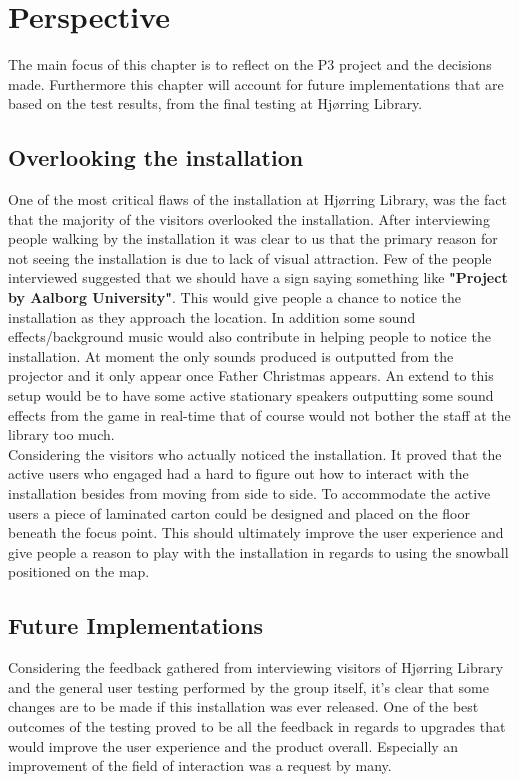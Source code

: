 \chapter{Perspective}
The main focus of this chapter is to reflect on the P3 project and the decisions made. Furthermore this chapter will account for future implementations that are based on the test results, from the final testing at Hj{\o}rring Library.
\section{Overlooking the installation}
One of the most critical flaws of the installation at Hj{\o}rring Library, was the fact that the majority of the visitors overlooked the installation. After interviewing people walking by the installation it was clear to us that the primary reason for not seeing the installation is due to lack of visual attraction. Few of the people interviewed suggested that we should have a sign saying something like \textbf{"Project by Aalborg University"}. This would give people a chance to notice the installation as they approach the location. In addition some sound effects/background music would also contribute in helping people to notice the installation. At moment the only sounds produced is outputted from the projector and it only appear once Father Christmas appears. An extend to this setup would be to have some active stationary speakers outputting some sound effects from the game in real-time that of course would not bother the staff at the library too much.\\
Considering the visitors who actually noticed the installation. It proved that the active users who engaged had a hard to figure out how to interact with the installation besides from moving from side to side. To accommodate the active users a piece of laminated carton could be designed and placed on the floor beneath the focus point. This should ultimately improve the user experience and give people a reason to play with the installation in regards to using the snowball positioned on the map.\\

\section{Future Implementations}
Considering the feedback gathered from interviewing visitors of Hj{\o}rring Library and the general user testing performed by the group itself, it's clear that some changes are to be made if this installation was ever released. One of the best outcomes of the testing proved to be all the feedback in regards to upgrades that would improve the user experience and the product overall. Especially an improvement of the field of interaction was a request by many.

